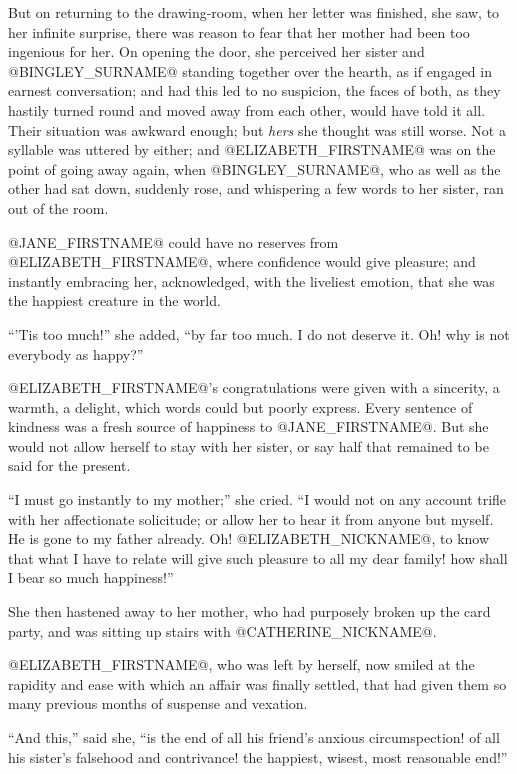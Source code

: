 But on returning to the drawing-room, when her letter was finished, she
saw, to her infinite surprise, there was reason to fear that her mother
had been too ingenious for her. On opening the door, she perceived her
sister and @BINGLEY_SURNAME@ standing together over the hearth, as if engaged in
earnest conversation; and had this led to no suspicion, the faces of
both, as they hastily turned round and moved away from each other, would
have told it all. Their situation was awkward enough; but \textit{hers} she
thought was still worse. Not a syllable was uttered by either; and
@ELIZABETH_FIRSTNAME@ was on the point of going away again, when @BINGLEY_SURNAME@, who as
well as the other had sat down, suddenly rose, and whispering a few
words to her sister, ran out of the room.

@JANE_FIRSTNAME@ could have no reserves from @ELIZABETH_FIRSTNAME@, where confidence would give
pleasure; and instantly embracing her, acknowledged, with the liveliest
emotion, that she was the happiest creature in the world.

``'Tis too much!'' she added, ``by far too much. I do not deserve it. Oh!
why is not everybody as happy?''

@ELIZABETH_FIRSTNAME@'s congratulations were given with a sincerity, a warmth,
a delight, which words could but poorly express. Every sentence of
kindness was a fresh source of happiness to @JANE_FIRSTNAME@. But she would not
allow herself to stay with her sister, or say half that remained to be
said for the present.

``I must go instantly to my mother;'' she cried. ``I would not on any
account trifle with her affectionate solicitude; or allow her to hear it
from anyone but myself. He is gone to my father already. Oh! @ELIZABETH_NICKNAME@, to
know that what I have to relate will give such pleasure to all my dear
family! how shall I bear so much happiness!''

She then hastened away to her mother, who had purposely broken up the
card party, and was sitting up stairs with @CATHERINE_NICKNAME@.

@ELIZABETH_FIRSTNAME@, who was left by herself, now smiled at the rapidity and ease
with which an affair was finally settled, that had given them so many
previous months of suspense and vexation.

``And this,'' said she, ``is the end of all his friend's anxious
circumspection! of all his sister's falsehood and contrivance! the
happiest, wisest, most reasonable end!''

